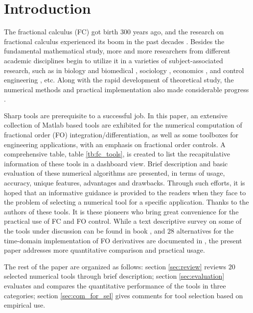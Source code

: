\documentclass[11pt]{tCON2e}
\theoremstyle{plain}\newtheorem{theorem}{Theorem}
\theoremstyle{definition}
\theoremstyle{remark}
\begin{document}
\section{Introduction}


The fractional calculus (FC) got birth 300 years ago, and the research on fractional calculus experienced its boom in the past decades \cite{ref:Mainardi_recent_FC, ref:Miller_Ross_intro_frac_book, ref:Agrawal_Machado_book_FC_advance}.
Besides the fundamental mathematical study, more and more researchers from different academic disciplines begin to utilize it in a varieties of subject-associated research, such as in biology and biomedical \cite{ref:Magin, ref:Bruce_Book_where}, sociology \cite{ref:Bruce_Book_social, ref:Book_of_Extremes}, economics \cite{ref:long_memo_new_model, ref:random_walk_wall_st_book}, and control engineering \cite{ref:Monje, ref:Yinchun_Automatica, ref:Zhuo_relay_id_fo}, etc.
Along with the rapid development of theoretical study, the numerical methods and practical implementation also made considerable progress \cite{ref:Machado_implementation, ref:Bohannan2, ref:Hartley6}.

Sharp tools are prerequisite to a successful job. In this paper, an extensive collection of Matlab based tools are exhibited for the numerical computation of fractional order (FO) integration/differentiation, as well as some toolboxes for engineering applications, with an emphasis on fractional order controls. A comprehensive table, table \ref{tb:fc_tools}, is created to list the recapitulative information of these tools in a dashboard view. Brief description and basic evaluation of these numerical algorithms are presented, in terms of usage, accuracy, unique features, advantages and drawbacks. Through such efforts, it is hoped that an informative guidance is provided to the readers when they face to the problem of selecting a numerical tool for a specific application.
Thanks to the authors of these tools. It is these pioneers who bring great convenience for the practical use of FC and FO control. While a text descriptive survey on some of the tools under discussion can be found in book \cite{ref:FO_sig_proc_2012}, and $28$ alternatives for the time-domain implementation of FO derivatives are documented in \cite{ref:Valerio_time_implem}, the present paper addresses more quantitative comparison and practical usage.

The rest of the paper are organized as follows: section \ref{sec:review} reviews $20$ selected numerical tools through brief description; section \ref{sec:evaluation} evaluates and compares the quantitative performance of the tools in three categories; section \ref{sec:com_for_sel} gives comments for tool selection based on empirical use.
\end{document}
